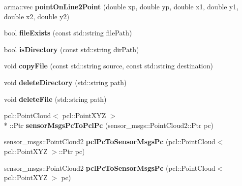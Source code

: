 \begin{DoxyCompactItemize}
\item 
\hypertarget{namespacekukadu_a67c10a1b48929f4eba41cb9d7783fa6f}{arma\-::vec {\bfseries point\-On\-Line2\-Point} (double xp, double yp, double x1, double y1, double x2, double y2)}\label{namespacekukadu_a67c10a1b48929f4eba41cb9d7783fa6f}

\item 
\hypertarget{namespacekukadu_acea96b38a689bb37e60bf5b2b1d8c647}{bool {\bfseries file\-Exists} (const std\-::string file\-Path)}\label{namespacekukadu_acea96b38a689bb37e60bf5b2b1d8c647}

\item 
\hypertarget{namespacekukadu_a38a6347a1a0d304a8d45a9d4889b53c1}{bool {\bfseries is\-Directory} (const std\-::string dir\-Path)}\label{namespacekukadu_a38a6347a1a0d304a8d45a9d4889b53c1}

\item 
\hypertarget{namespacekukadu_a6a9de076b50575d26267cb848d76bc63}{void {\bfseries copy\-File} (const std\-::string source, const std\-::string destination)}\label{namespacekukadu_a6a9de076b50575d26267cb848d76bc63}

\item 
\hypertarget{namespacekukadu_abfc9dfeb9dd1af314816fbaca89bc25d}{void {\bfseries delete\-Directory} (std\-::string path)}\label{namespacekukadu_abfc9dfeb9dd1af314816fbaca89bc25d}

\item 
\hypertarget{namespacekukadu_a13aab802ace83e2d78679d3a2a94fbff}{void {\bfseries delete\-File} (std\-::string path)}\label{namespacekukadu_a13aab802ace83e2d78679d3a2a94fbff}

\item 
\hypertarget{namespacekukadu_a01fe6b369ac376f93e351b557ca063c9}{pcl\-::\-Point\-Cloud$<$ pcl\-::\-Point\-X\-Y\-Z $>$\\*
\-::Ptr {\bfseries sensor\-Msgs\-Pc\-To\-Pcl\-Pc} (sensor\-\_\-msgs\-::\-Point\-Cloud2\-::\-Ptr pc)}\label{namespacekukadu_a01fe6b369ac376f93e351b557ca063c9}

\item 
\hypertarget{namespacekukadu_a74b71ae04f8ed25e3613a98a66247683}{sensor\-\_\-msgs\-::\-Point\-Cloud2 {\bfseries pcl\-Pc\-To\-Sensor\-Msgs\-Pc} (pcl\-::\-Point\-Cloud$<$ pcl\-::\-Point\-X\-Y\-Z $>$\-::Ptr pc)}\label{namespacekukadu_a74b71ae04f8ed25e3613a98a66247683}

\item 
\hypertarget{namespacekukadu_aac131ec085769630ebda9ae56193e2ef}{sensor\-\_\-msgs\-::\-Point\-Cloud2 {\bfseries pcl\-Pc\-To\-Sensor\-Msgs\-Pc} (pcl\-::\-Point\-Cloud$<$ pcl\-::\-Point\-X\-Y\-Z $>$ pc)}\label{namespacekukadu_aac131ec085769630ebda9ae56193e2ef}


\end{DoxyCompactItemize}
